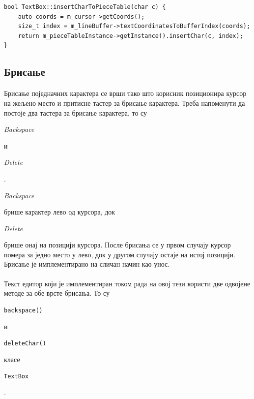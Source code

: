 \documentclass[12pt,oneside]{memoir}
\begin{document}
\begin{verbatim}
bool TextBox::insertCharToPieceTable(char c) {
	auto coords = m_cursor->getCoords();
	size_t index = m_lineBuffer->textCoordinatesToBufferIndex(coords);
	return m_pieceTableInstance->getInstance().insertChar(c, index);
}
\end{verbatim}


\subsection{Брисање}
\paragraph{}
Брисање поједначних карактера се врши тако што корисник позиционира курсор
на жељено место и притисне тастер за брисање карактера. Треба напоменути да 
постоје два тастера за брисање карактера, то су \begin{latinica}\textit{Backspace}\end{latinica}
и \begin{latinica}\textit{Delete}\end{latinica}.
\begin{latinica}\textit{Backspace}\end{latinica} брише карактер лево од курсора,
док \begin{latinica}\textit{Delete}\end{latinica} брише онај на позицији курсора.
После брисања се у првом случају курсор помера за једно место у лево, док у другом
случају остаје на истој позицији. Брисање је имплементирано на сличан начин као унос.

\paragraph{}
Текст едитор који је имплементиран током рада на овој тези користи две одвојене
методе за обе врсте брисања. То су 
\begin{latinica}\verb|backspace()| \end{latinica} и
\begin{latinica}\verb|deleteChar()| \end{latinica} класе
\begin{latinica}\verb|TextBox| \end{latinica}.
\end{document}

